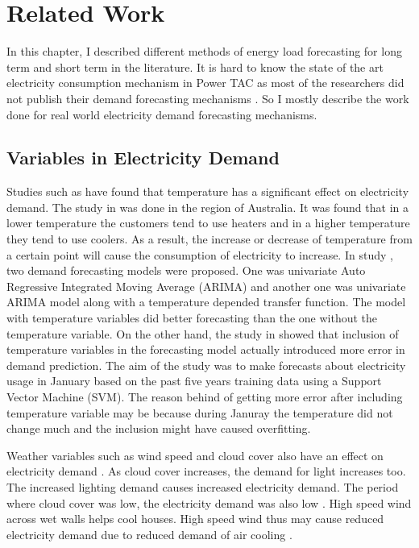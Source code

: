 
\chapter{Related Work}

In this chapter, I described different methods of energy load forecasting for long term and short term in the literature. It is hard to know the state of the art electricity consumption mechanism in Power TAC as most of the researchers did not publish their demand forecasting mechanisms \cite{liefers2014successful, ozdemir2015winner, serranofixing, ozdemir2015agentude}. So I mostly describe the work done for real world electricity demand forecasting mechanisms.   

\section{Variables in Electricity Demand}

Studies such as \cite{hor2005analyzing, hart2004weather, cho1995customer} have found that temperature has a significant effect on electricity demand. The study in \cite{hart2004weather} was done in the region of Australia.  It was found that in a lower temperature the customers tend to use heaters and in a higher temperature they tend to use coolers. As a result, the increase or decrease of temperature from a certain point will cause the consumption of electricity to increase. In study \cite{cho1995customer}, two demand forecasting models were proposed. One was univariate Auto Regressive Integrated Moving Average (ARIMA) and another one was univariate ARIMA model along with a temperature depended transfer function. The model with temperature variables did better forecasting than the one without the temperature variable. On the other hand, the study in  \cite{chen2004load} showed that inclusion of temperature variables in the forecasting model actually introduced more error in demand prediction. The aim of the study was to make forecasts about electricity usage in January based on the past five years training data using a Support Vector Machine (SVM). The reason behind of getting more error after including temperature variable may be because during Januray the temperature did not change much and the inclusion might have caused overfitting. 

Weather variables such as  wind speed and cloud cover also have an effect on electricity demand \cite{hor2005analyzing, rudenauer2004energy}. As cloud cover increases, the demand for light increases too. The increased lighting demand causes increased electricity demand. The period where cloud cover was low, the electricity demand was also low \cite{hor2005analyzing}. High speed wind across wet walls helps cool houses. High speed wind thus may cause reduced electricity demand due to reduced demand of air cooling \cite{rudenauer2004energy}. 


